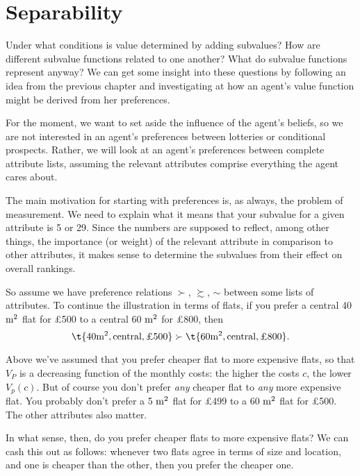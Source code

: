 \section{Separability}

Under what conditions is value determined by adding subvalues? How are
different subvalue functions related to one another? What do subvalue
functions represent anyway? We can get some insight into these
questions by following an idea from the previous chapter and
investigating at how an agent's value function might be derived from
her preferences.

For the moment, we want to set aside the influence of the agent's
beliefs, so we are not interested in an agent's preferences between
lotteries or conditional prospects. Rather, we will look at an agent's
preferences between complete attribute lists, assuming the relevant
attributes comprise everything the agent cares about. 

The main motivation for starting with preferences is, as always, the
problem of measurement. We need to explain what it means that your
subvalue for a given attribute is 5 or 29. Since the numbers are
supposed to reflect, among other things, the importance (or weight) of
the relevant attribute in comparison to other attributes, it makes
sense to determine the subvalues from their effect on overall
rankings.
 
So assume we have preference relations $\succ$, $\succsim$, $\sim$
between some lists of attributes. To continue the illustration in
terms of flats, if you prefer a central 40 $\text{m}^2$ flat for £500 to a
central 60 $\text{m}^2$ for £800, then
\[
 \t{40 \m^2, \text{central}, \text{£500}} \succ
 \t{60 \m^2, \text{central}, \text{£800}}.
\]

Above we've assumed that you prefer cheaper flat to more expensive
flats, so that $V_P$ is a decreasing function of the monthly costs:
the higher the costs $c$, the lower $V_p(c)$. But of course you don't
prefer \emph{any} cheaper flat to \emph{any} more expensive flat. You
probably don't prefer a 5 $\text{m}^2$ flat for £499 to a 60 $\text{m}^2$ flat 
for £500. The other attributes also matter.

In what sense, then, do you prefer cheaper flats to more expensive
flats? We can cash this out as follows: whenever two flats agree in
terms of size and location, and one is cheaper than the other, then
you prefer the cheaper one. 


